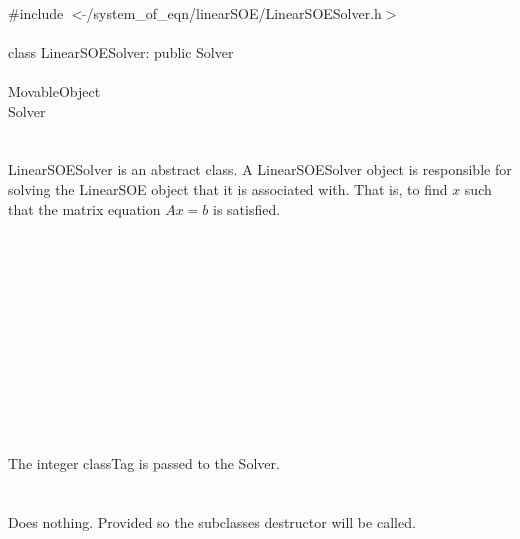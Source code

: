 
   \\
\indent \#include $<\tilde{ }$/system\_of\_eqn/linearSOE/LinearSOESolver.h$>$  \\

  \\
\indent class LinearSOESolver: public Solver  \\

 \\
\indent MovableObject \\
\indent\indent  Solver \\
\indent\indent{} \\

  \\
\indent LinearSOESolver is an abstract class. A LinearSOESolver object is
responsible for solving the LinearSOE object that it is associated
with. That is, to find $x$ such that the matrix equation $Ax=b$ is
satisfied. \\

  \\
\indent{} \\
\indent{}  \\ \\
\indent{} \\
\indent{}\\  \\
\indent{}  \\
\indent{} \\
\indent{} \\

  \\
  \\
The integer \p classTag is passed to the Solver. \\

 \\
\\ 
Does nothing. Provided so the subclasses destructor will be called. \\

